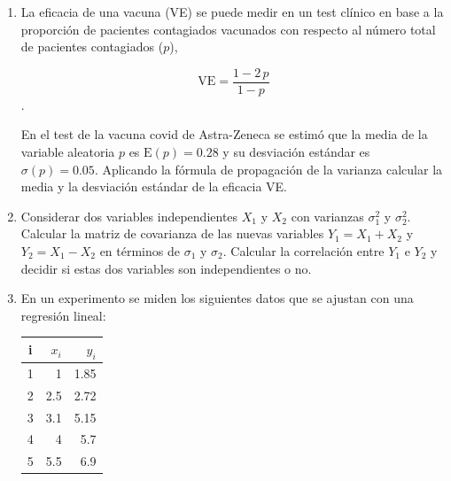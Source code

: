 \documentclass[a4paper,11pt]{article}
\begin{document}
\begin{enumerate}
\item La eficacia de una vacuna (VE) se puede medir en un test clínico en base a la proporción de pacientes contagiados vacunados con respecto al número total de pacientes contagiados ($p$), 

$$ \mathrm{VE} = \frac{1-2\,p}{1-p}$$. 

En el test de la vacuna covid de Astra-Zeneca se estimó que la media de la variable aleatoria $p$ es $\mathrm{E}(p) = 0.28$ y su desviación estándar es $\sigma(p) = 0.05$. Aplicando la fórmula de propagación de la varianza calcular la media y la desviación estándar de la eficacia VE. 



\item Considerar dos variables independientes $X_1$ y $X_2$ con varianzas $\sigma_1^2$ y $\sigma_2^2$. 
Calcular la matriz de covarianza de las nuevas variables $Y_1 = X_1 + X_2$ y $Y_2 = X_1 - X_2$ en términos de $\sigma_1$ y $\sigma_2$. Calcular la correlación entre $Y_1$ e $Y_2$ y decidir si estas dos variables son independientes o no.






\item  En un experimento se miden los siguientes datos que se ajustan con una regresión lineal: 

\begin{center}
    \begin{tabular}{crr}
    i & $x_i$ & $y_i$ \\ \hline
    1 & 1 & 1.85 \\
    2 & 2.5 & 2.72 \\
    3 & 3.1 & 5.15 \\
    4 & 4 & 5.7 \\
    5 & 5.5 & 6.9 
    \end{tabular} 
\end{center} 


\end{enumerate}
\end{document}
